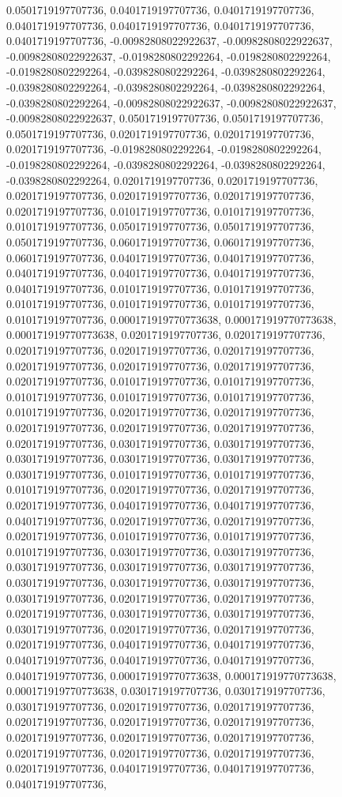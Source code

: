 \documentclass[
  ,man]{apa6}
\begin{document}
0.0501719197707736, 0.0401719197707736, 0.0401719197707736, 0.0401719197707736, 0.0401719197707736, 0.0401719197707736, 0.0401719197707736, -0.00982808022922637, -0.00982808022922637, -0.00982808022922637, -0.0198280802292264, -0.0198280802292264, -0.0198280802292264, -0.0398280802292264, -0.0398280802292264, -0.0398280802292264, -0.0398280802292264, -0.0398280802292264, -0.0398280802292264, -0.00982808022922637, -0.00982808022922637, -0.00982808022922637, 0.0501719197707736, 0.0501719197707736,
0.0501719197707736, 0.0201719197707736, 0.0201719197707736, 0.0201719197707736, -0.0198280802292264, -0.0198280802292264, -0.0198280802292264, -0.0398280802292264, -0.0398280802292264, -0.0398280802292264, 0.0201719197707736, 0.0201719197707736, 0.0201719197707736, 0.0201719197707736, 0.0201719197707736, 0.0201719197707736, 0.0101719197707736, 0.0101719197707736, 0.0101719197707736, 0.0501719197707736, 0.0501719197707736, 0.0501719197707736, 0.0601719197707736, 0.0601719197707736, 0.0601719197707736,
0.0401719197707736, 0.0401719197707736, 0.0401719197707736, 0.0401719197707736, 0.0401719197707736, 0.0401719197707736, 0.0101719197707736, 0.0101719197707736, 0.0101719197707736, 0.0101719197707736, 0.0101719197707736, 0.0101719197707736, 0.000171919770773638, 0.000171919770773638, 0.000171919770773638, 0.0201719197707736, 0.0201719197707736, 0.0201719197707736, 0.0201719197707736, 0.0201719197707736, 0.0201719197707736, 0.0201719197707736, 0.0201719197707736, 0.0201719197707736, 0.0101719197707736,
0.0101719197707736, 0.0101719197707736, 0.0101719197707736, 0.0101719197707736, 0.0101719197707736, 0.0201719197707736, 0.0201719197707736, 0.0201719197707736, 0.0201719197707736, 0.0201719197707736, 0.0201719197707736, 0.0301719197707736, 0.0301719197707736, 0.0301719197707736, 0.0301719197707736, 0.0301719197707736, 0.0301719197707736, 0.0101719197707736, 0.0101719197707736, 0.0101719197707736, 0.0201719197707736, 0.0201719197707736, 0.0201719197707736, 0.0401719197707736, 0.0401719197707736, 0.0401719197707736,
0.0201719197707736, 0.0201719197707736, 0.0201719197707736, 0.0101719197707736, 0.0101719197707736, 0.0101719197707736, 0.0301719197707736, 0.0301719197707736, 0.0301719197707736, 0.0301719197707736, 0.0301719197707736, 0.0301719197707736, 0.0301719197707736, 0.0301719197707736, 0.0301719197707736, 0.0201719197707736, 0.0201719197707736, 0.0201719197707736, 0.0301719197707736, 0.0301719197707736, 0.0301719197707736, 0.0201719197707736, 0.0201719197707736, 0.0201719197707736, 0.0401719197707736, 0.0401719197707736,
0.0401719197707736, 0.0401719197707736, 0.0401719197707736, 0.0401719197707736, 0.000171919770773638, 0.000171919770773638, 0.000171919770773638, 0.0301719197707736, 0.0301719197707736, 0.0301719197707736, 0.0201719197707736, 0.0201719197707736, 0.0201719197707736, 0.0201719197707736, 0.0201719197707736, 0.0201719197707736, 0.0201719197707736, 0.0201719197707736, 0.0201719197707736, 0.0201719197707736, 0.0201719197707736, 0.0201719197707736, 0.0401719197707736, 0.0401719197707736, 0.0401719197707736,
\end{document}
